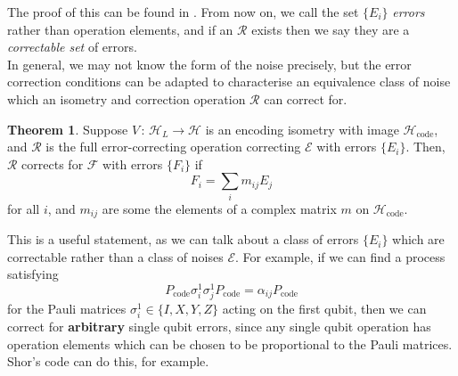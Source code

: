 \documentclass[12pt,a4paper]{report}
\numberwithin{equation}{section}
\newcommand{\Pc}{P_{\text{code}}}
\newcommand{\Hcode}{\mathcal{H}_{\text{code}}}
\theoremstyle{definition}
\theoremstyle{theorem}
\newtheorem{theorem}{Theorem}[section]
\theoremstyle{theorem}
\theoremstyle{example}
\theoremstyle{definition}
\begin{document}
The proof of this can be found in \cite{NielsenChuang}. From now on, we call the set $\{E_{i}\}$ \textit{errors} rather than operation elements, and if an $\mathcal{R}$ exists then we say they are a \textit{correctable set} of errors.\\
In general, we may not know the form of the noise precisely, but the error correction conditions can be adapted to characterise an equivalence class of noise which an isometry and correction operation $\mathcal{R}$ can correct for.
\begin{theorem}
	Suppose $V\,:\,\mathcal{H}_{L}\to\mathcal{H}$ is an encoding isometry with image $\Hcode$, and $\mathcal{R}$ is the full error-correcting operation correcting $\mathcal{E}$ with errors $\{E_{i}\}$. Then, $\mathcal{R}$ corrects for $\mathcal{F}$ with errors $\{F_{i}\}$ if
	\begin{equation}
		F_{i}=\sum_{i}m_{ij}E_{j}
	\end{equation}
	for all $i$, and $m_{ij}$ are some the elements of a complex matrix $m$ on $\Hcode$.
\end{theorem}
This is a useful statement, as we can talk about a class of errors $\{E_{i}\}$ which are correctable rather than a class of noises $\mathcal{E}$. For example, if we can find a process satisfying
\begin{equation}
	\Pc \sigma_{i}^{1}\sigma_{j}^{1}\Pc=\alpha_{ij}\Pc
\end{equation}
for the Pauli matrices $\sigma_{i}^{1}\in\{I,X,Y,Z\}$ acting on the first qubit, then we can correct for \textbf{arbitrary} single qubit errors, since any single qubit operation has operation elements which can be chosen to be proportional to the Pauli matrices. Shor's code \cite{PhysRevA.52.R2493} can do this, for example.
\end{document}
